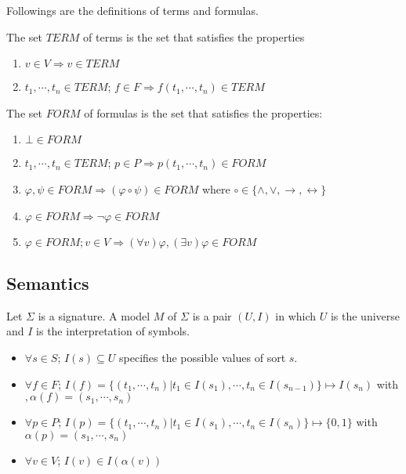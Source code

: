 Followings are the definitions of terms and formulas.

\begin{definition}
The set $TERM$ of terms is the set that satisfies the properties
\begin{enumerate}
\item $v \in V \Rightarrow v \in TERM$
\item $t_1,\cdots,t_n \in TERM$; $f \in F \Rightarrow f(t_1,\cdots, t_n) \in TERM$
\end{enumerate}
\end{definition}

\begin{definition}
The set $FORM$ of formulas is the set that satisfies the properties:
\begin{enumerate}
\item $\bot \in FORM$
\item $t_1,\cdots,t_n \in TERM$; $p \in P \Rightarrow p(t_1,\cdots, t_n) \in FORM$
\item $\varphi, \psi \in FORM \Rightarrow (\varphi \circ \psi) \in FORM$ where $\circ \in \{\wedge, \vee, \rightarrow, \leftrightarrow\}$
\item $\varphi \in FORM \Rightarrow \neg\varphi \in FORM$
\item $\varphi \in FORM; v \in V \Rightarrow (\forall v)\varphi, (\exists v)\varphi \in FORM$
\end{enumerate}
\end{definition}

\subsection{Semantics}

\begin{definition}
Let $\Sigma$ is a signature. A model $M$ of $\Sigma$ is a pair $(U, I)$ in which $U$ is the universe and $I$ is the interpretation of symbols.
\begin{itemize}
\item $\forall s \in S$; $I(s) \subseteq U$ specifies the possible values of sort $s$.
\item $\forall f \in F$; $I(f) = \{(t_1,\cdots, t_n)| t_1 \in I(s_1),\cdots, t_n \in I(s_{n-1})\} \mapsto I(s_n)$ with $, \alpha(f) = (s_1,\cdots, s_n)$
\item $\forall p \in P$; $I(p) = \{(t_1,\cdots, t_n)| t_1 \in I(s_1),\cdots, t_n \in I(s_n)\} \mapsto \{0, 1\}$ with $\alpha(p) = (s_1,\cdots, s_n)$
\item $\forall v \in V$; $I(v) \in I(\alpha(v))$
\end{itemize}
\end{definition}

